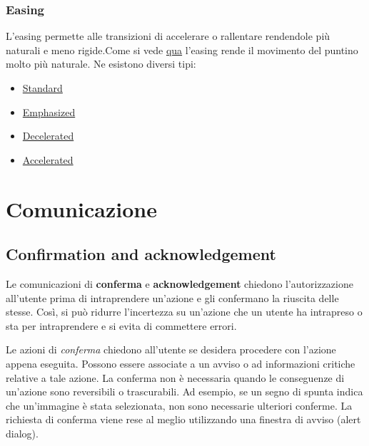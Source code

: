 \documentclass[12pt, a4paper]{report}
\begin{document}
		\subsubsection{Easing}
		L'easing permette alle transizioni di accelerare o rallentare rendendole più naturali e meno rigide.Come si vede \href{https://kstatic.googleusercontent.com/files/cd28926c3e6b98926788199361bc3e613f6fd98234fa12e143fe528ba629f0ee7318c16acf5a389820d4789f43c12b011880909e39a59d73377a5a1c270bbe52}{qua}
		l'easing rende il movimento del puntino molto più naturale.
		Ne esistono diversi tipi:
		\begin{itemize}
			\item \href{https://kstatic.googleusercontent.com/files/c60193433c491a0ea5b95fd2740fab851ff3572e5191ceab47a9a9586262a6bf354baa78f19b1bdbaca0674562971cec7d0e8e45f56e8d79dadd95329ed907d5}{Standard}
			\item \href{https://kstatic.googleusercontent.com/files/1b3b1c294a5075226c259f5af1569e9e79606bd65ddb27afa1ccf4815d627c6c9b6c787d59a7bb26861694727a30e6fcf5d4def3388d973920339d25aca6c8f3}{Emphasized}
			\item \href{https://kstatic.googleusercontent.com/files/b624b31824d5a199f82de3273246101bf20dbb079c3a81a2b7b66bf6ef96ac97808fc8f27180310345f977aae93c2581a1f9280963c92ed71c95107583fe3d9a}{Decelerated}
			\item \href{https://kstatic.googleusercontent.com/files/4e2afcefc0aa8b74bdd1980114e5e8bd8b7b13e7944c17f9710731c22fed2f80e89edb91ec904a14d511a469de73f487836f86e0c91f0e98f31419ed3106a408}{Accelerated}
		\end{itemize}

	\section{Comunicazione}
	\subsection{Confirmation and acknowledgement}
	Le comunicazioni di \textbf{conferma} e \textbf{acknowledgement} chiedono l’autorizzazione all’utente prima di intraprendere un'azione e gli confermano la riuscita delle stesse. Così, si può ridurre l'incertezza su un'azione che un utente ha intrapreso o sta per intraprendere e si evita di commettere errori.

	Le azioni di \textit{conferma}  chiedono all'utente se desidera procedere con l'azione appena eseguita. Possono essere associate a un avviso o ad informazioni critiche relative a tale azione. La conferma non è necessaria quando le conseguenze di un'azione sono reversibili o trascurabili. Ad esempio, se un segno
	di spunta indica che un'immagine è stata selezionata, non sono necessarie ulteriori conferme. La richiesta di conferma viene rese al meglio utilizzando una finestra di avviso (alert dialog).
\end{document}
